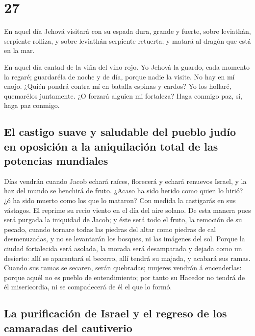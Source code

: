 \hypertarget{section-23-27}{%
\section{27}\label{section-23-27}}

 En aquel día Jehová visitará con su espada dura, grande y
fuerte, sobre leviathán, serpiente rolliza, y sobre leviathán serpiente
retuerta; y matará al dragón que está en la mar.

 En aquel día cantad de la viña del vino rojo.
 Yo Jehová la guardo, cada momento la regaré; guardaréla
de noche y de día, porque nadie la visite.  No hay en mí
enojo. ¿Quién pondrá contra mí en batalla espinas y cardos? Yo los
hollaré, quemarélos juntamente.  ¿O forzará alguien mi
fortaleza? Haga conmigo paz, sí, haga paz conmigo.

\hypertarget{el-castigo-suave-y-saludable-del-pueblo-juduxedo-en-oposiciuxf3n-a-la-aniquilaciuxf3n-total-de-las-potencias-mundiales}{%
\subsection{El castigo suave y saludable del pueblo judío en oposición a
la aniquilación total de las potencias
mundiales}\label{el-castigo-suave-y-saludable-del-pueblo-juduxedo-en-oposiciuxf3n-a-la-aniquilaciuxf3n-total-de-las-potencias-mundiales}}

 Días vendrán cuando Jacob echará raíces, florecerá y
echará renuevos Israel, y la haz del mundo se henchirá de fruto.
 ¿Acaso ha sido herido como quien lo hirió? ¿ó ha sido
muerto como los que lo mataron?  Con medida la castigarás
en sus vástagos. El reprime su recio viento en el día del aire solano.
 De esta manera pues será purgada la iniquidad de Jacob; y
éste será todo el fruto, la remoción de su pecado, cuando tornare todas
las piedras del altar como piedras de cal desmenuzadas, y no se
levantarán los bosques, ni las imágenes del sol.  Porque
la ciudad fortalecida será asolada, la morada será desamparada y dejada
como un desierto: allí se apacentará el becerro, allí tendrá su majada,
y acabará sus ramas.  Cuando sus ramas se secaren, serán
quebradas; mujeres vendrán á encenderlas: porque aquél no es pueblo de
entendimiento; por tanto su Hacedor no tendrá de él misericordia, ni se
compadecerá de él el que lo formó.

\hypertarget{la-purificaciuxf3n-de-israel-y-el-regreso-de-los-camaradas-del-cautiverio}{%
\subsection{La purificación de Israel y el regreso de los camaradas del
cautiverio}\label{la-purificaciuxf3n-de-israel-y-el-regreso-de-los-camaradas-del-cautiverio}}

